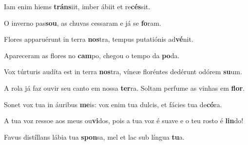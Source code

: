 \begin{greenumerate}
  \setcounter{enumi}{1}


  \item Iam enim hiems \textbf{tráns}iit, {\GreStar} imber ábiit et re\textbf{cés}sit. 

  \switchcolumn\setcounter{enumi}{1}

  \item O inverno pas\textbf{sou}, {\GreStar} as chuvas cessaram e já se \textbf{fo}ram. 

  \switchcolumn*


  \item Flores apparuérunt in terra \textbf{nos}tra, {\GreStar} tempus putatiónis ad\textbf{vé}nit. 

  \switchcolumn%
  \item Apareceram as flores no \textbf{cam}po, {\GreStar} chegou o tempo da \textbf{po}\-da. 

  \switchcolumn*


  \item Vox túrturis audíta est in terra \textbf{nos}tra, {\GreStar} víneæ floréntes dedérunt odórem \textbf{su}um. 

  \switchcolumn%

  \item A rola já faz ouvir seu canto em nossa \textbf{ter}ra. {\GreStar} Soltam perfume as vinhas em \textbf{flor}. 

  \switchcolumn*


  \item Sonet vox tua in áuribus \textbf{me}is: {\GreStar} vox enim tua dulcis, et fácies tua de\textbf{có}ra. 

  \switchcolumn%

  \item A tua voz ressoe aos meus ou\textbf{vi}dos, {\GreStar} pois a tua voz é suave e o teu rosto é \textbf{lin}do! 

  \switchcolumn*


  \item Favus distíllans lábia tua \textbf{spon}sa, {\GreStar} mel et lac sub língua \textbf{tu}a. 


\end{greenumerate}
